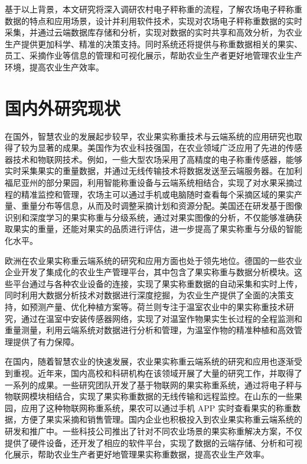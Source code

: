 \documentclass{xduugthesis}
\begin{document}
基于以上背景，本文研究将深入调研农村电子秤称重的流程，了解农场电子秤称重数据的特点和应用场景，设计并利用软件技术，实现对农场电子秤称重数据的实时采集，并通过云端数据库存储和分析，实现对数据的实时共享和高效分析，为农业生产提供更加科学、精准的决策支持。同时系统还将提供与称重数据相关的果实、员工、采摘作业等信息的管理和可视化展示，帮助农业生产者更好地管理农业生产环境，提高农业生产效率。

\section{国内外研究现状}

在国外，智慧农业的发展起步较早，农业果实称重技术与云端系统的应用研究也取得了较为显著的成果。美国作为农业科技强国，在农业领域广泛应用了先进的传感器技术和物联网技术\cite{赵春江2021智慧农业的发展现状与未来展望}。例如，一些大型农场采用了高精度的电子称重传感器，能够实时采集果实的重量数据，并通过无线传输技术将数据发送至云端服务器\cite{陈学庚2020农业机械与信息技术融合发展现状与方向}。在加利福尼亚州的部分果园，利用智能称重设备与云端系统相结合，实现了对水果采摘过程的精准监控和管理\cite{Ampatzidis2011}，农场主可以通过手机或电脑随时查看每个采摘区域的果实产量、重量分布等信息，从而及时调整采摘计划和资源分配。美国还在研发基于图像识别和深度学习的果实称重与分级系统，通过对果实图像的分析\cite{Anisha2019FruitRU}，不仅能够准确获取果实的重量，还能对果实的品质进行评估，进一步提高了果实称重与分级的智能化水平。

欧洲在农业果实称重云端系统的研究和应用方面也处于领先地位。德国的一些农业企业开发了集成化的农业生产管理平台，其中包含了果实称重与数据分析模块\cite{Yin2020}。这些平台通过与各种农业设备的连接，实现了果实称重数据的自动采集和实时上传，同时利用大数据分析技术对数据进行深度挖掘，为农业生产提供了全面的决策支持，如预测产量、优化种植方案等\cite{Phate2021}。荷兰则专注于温室农业中的果实称重技术研究，通过在温室中安装传感器网络，实现了对温室作物果实生长过程的全程监测和重量测量\cite{Graaf2004}，利用云端系统对数据进行分析和管理，为温室作物的精准种植和高效管理提供了有力保障。

在国内，随着智慧农业的快速发展，农业果实称重云端系统的研究和应用也逐渐受到重视。近年来，国内高校和科研机构在该领域开展了大量的研究工作，并取得了一系列的成果。一些研究团队开发了基于物联网的果实称重系统，通过将电子秤与物联网模块相结合，实现了果实称重数据的无线传输和远程监控\cite{Zhu2013}。在山东的一些果园，应用了这种物联网称重系统，果农可以通过手机 APP 实时查看果实的称重数据，方便了果实采摘和销售管理\cite{Gao2023}。国内企业也积极投入到农业果实称重云端系统的研发和推广中。一些科技公司推出了针对不同农业场景的果实称重解决方案\cite{Ningbo2019}，不仅提供了硬件设备，还开发了相应的软件平台，实现了数据的云端存储、分析和可视化展示，帮助农业生产者更好地管理果实称重数据，提高农业生产效率。
\end{document}
